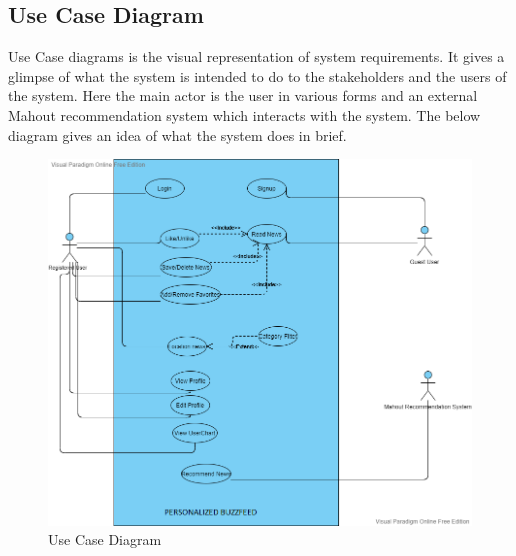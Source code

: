              \subsection{Use Case Diagram}
            Use Case diagrams is the visual representation of system requirements. It gives a glimpse of what the system is intended to do to the stakeholders and the users of the system. Here the main actor is the user in various forms and an external Mahout recommendation system which interacts with the system. The below diagram gives an idea of what the system does in brief.
             \begin{figure}[h!]
                \includegraphics[scale=0.9]{images/Buzzfeed.vpd.png}
                 \centering \caption{Use Case Diagram}
            \end{figure}
      
